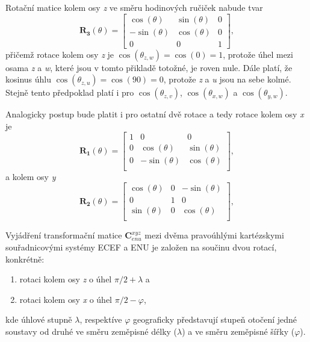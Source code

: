 \documentclass[11pt,a4paper]{article}
\begin{document}
Rotační matice kolem osy \textit{z} ve směru hodinových ručiček nabude tvar
\begin{equation}
\mathbf{R_{3}}\left(\theta\right) = 
\begin{bmatrix}
\cos{\left(\theta\right)} & \sin{\left(\theta\right)} & 0 \\
-\sin{\left(\theta\right)} & \cos{\left(\theta\right)} & 0 \\
0 & 0 & 1
\end{bmatrix},
\end{equation}
přičemž rotace kolem osy \textit{z} je $\cos{\left(\theta_{z, w} \right)} = \cos{\left(0\right)} = 1$, protože úhel mezi osama \textit{z} a \textit{w}, které jsou v tomto přikladě totožné, je roven nule. Dále platí, že kosinus úhlu $ \cos{\left(\theta_{z, u} \right)}= \cos{\left(90\right)} = 0 $, protože \textit {z} a \textit {u} jsou na sebe kolmé. Stejně tento předpoklad platí i pro $\cos{\left(\theta_{z,v}\right)}$, $\cos{\left(\theta_{x,w}\right)}$ a $\cos{\left(\theta_{y,w}\right)}$.

Analogicky postup bude platit i pro ostatní dvě rotace a tedy rotace kolem osy \textit{x} je
\begin{equation}
\mathbf{R_{1}}\left(\theta\right) = 
\begin{bmatrix}
1 & 0 & 0 \\
0 &  \cos{\left(\theta\right)} & \sin{\left(\theta\right)} \\
0 & -\sin{\left(\theta\right)} & \cos{\left(\theta\right)} \\
\end{bmatrix},
\end{equation}
a kolem osy \textit{y}
\begin{equation}
\mathbf{R_{2}}\left(\theta\right) = 
\begin{bmatrix}
\cos{\left(\theta\right)} & 0 & -\sin{\left(\theta\right)} \\
0 & 1 & 0 \\
\sin{\left(\theta\right)} & 0 & \cos{\left(\theta\right)} \\
\end{bmatrix},
\end{equation}

Vyjádření transformační matice $\mathbf {C}_{enu}^{xyz} $ mezi dvěma pravoúhlými kartézskymi souřadnicovými systémy ECEF a ENU je založen na součinu dvou rotací, konkrétně:
\begin{enumerate}
\item rotaci kolem osy \textit{z} o úhel $\pi/2 + \lambda $ a
\item rotaci kolem osy \textit{x} o úhel $\pi/2 - \varphi $,
\end{enumerate}
kde úhlové stupně $\lambda$, respektíve $\varphi$ geograficky představují stupeň otočení jedné soustavy od druhé ve směru zeměpisné délky ($\lambda$) a ve směru zeměpisné šířky ($\varphi$).
\end{document}
